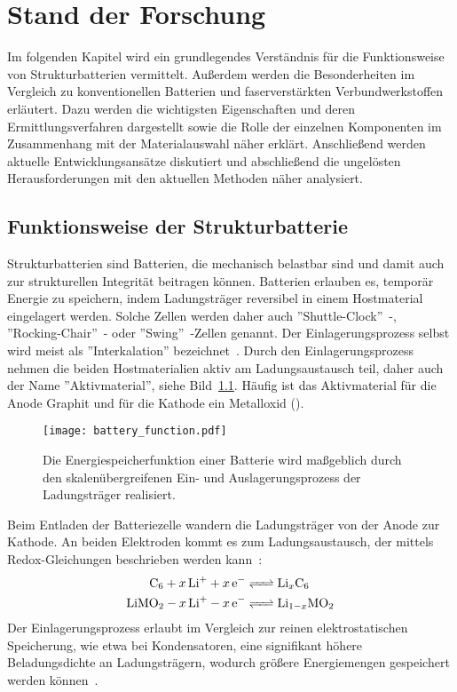 \chapter{Stand der Forschung}

Im folgenden Kapitel wird ein grundlegendes Verständnis für die Funktionsweise von Strukturbatterien vermittelt. Außerdem werden die Besonderheiten im Vergleich zu konventionellen Batterien und faserverstärkten Verbundwerkstoffen erläutert. Dazu werden die wichtigsten Eigenschaften und deren Ermittlungsverfahren dargestellt sowie die Rolle der einzelnen Komponenten im Zusammenhang mit der Materialauswahl näher erklärt. Anschließend werden aktuelle Entwicklungsansätze diskutiert und abschließend die ungelösten Herausforderungen mit den aktuellen Methoden näher analysiert.

\section{Funktionsweise der Strukturbatterie} Strukturbatterien sind Batterien, die mechanisch belastbar sind und damit auch zur strukturellen Integrität beitragen können.
Batterien erlauben es, temporär Energie zu speichern, indem Ladungsträger reversibel in einem Hostmaterial eingelagert werden. Solche Zellen werden daher auch ''Shuttle-Clock''~\cite{Ohzuku1993}-, ''Rocking-Chair''~\cite{Tarascon1993}- oder ''Swing''~\cite{Bittihn1993}-Zellen genannt. Der Einlagerungsprozess selbst wird meist als ''Interkalation'' bezeichnet~\cite{Eichinger1976}. Durch den Einlagerungsprozess nehmen die beiden Hostmaterialien aktiv am Ladungsaustausch teil, daher auch der Name ''Aktivmaterial'', siehe Bild~\ref{fig:battery_function}. Häufig ist das Aktivmaterial für die Anode Graphit und für die Kathode ein Metalloxid ().
\begin{figure}[h]
        \center
	\texttt{[image: battery\_function.pdf]}
		\caption{\label{fig:battery_function}Die Energiespeicherfunktion einer Batterie wird maßgeblich durch den skalenübergreifenen Ein- und Auslagerungsprozess der Ladungsträger realisiert.}
\end{figure}
Beim Entladen der Batteriezelle wandern die Ladungsträger von der Anode zur Kathode. An beiden Elektroden kommt es zum Ladungsaustausch, der mittels Redox-Gleichungen beschrieben werden kann~\cite{Goodenough2013}: 
\begin{align}
	\ce{C_6 + x Li^+ + x e^- &<=> Li_xC_6}\\ 
	\ce{LiMO_2 - x Li^+ - x e^- &<=> Li_{1-x}MO_2} 
\end{align} 
Der Einlagerungsprozess erlaubt im Vergleich zur reinen elektrostatischen Speicherung, wie etwa bei Kondensatoren, eine signifikant höhere Beladungsdichte an Ladungsträgern, wodurch größere Energiemengen gespeichert werden können~\cite{Newman2021}.

